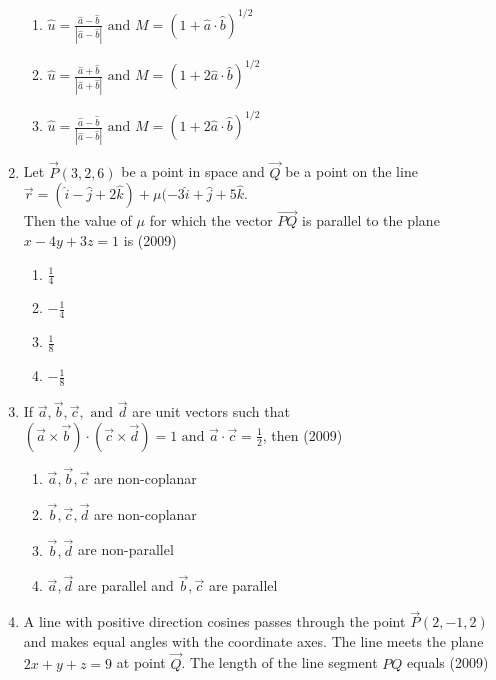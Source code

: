 \documentclass[journal,12pt,onecolumn]{IEEEtran}
\theoremstyle{remark}
\begin{document}
\begin{enumerate}
\begin{enumerate}
    \item $\hat{u} = \frac{\hat{a}-\hat{b}}{|\hat{a}-\hat{b}|} \text{ and } M = (1+\hat{a} \cdot \hat{b})^{1/2}$
    \item $\hat{u} = \frac{\hat{a}+\hat{b}}{|\hat{a}+\hat{b}|} \text{ and } M = (1+2\hat{a} \cdot \hat{b})^{1/2}$
    \item $\hat{u} = \frac{\hat{a}-\hat{b}}{|\hat{a}-\hat{b}|} \text{ and } M = (1+2\hat{a} \cdot \hat{b})^{1/2}$
    \end{enumerate}
    \item Let $\vec{P}(3,2,6)$ be a point in space and $\vec{Q}$ be a point on the line \\ 
    $\vec{r} = (\hat{i} - \hat{j} + 2\hat{k}) + \mu(-3\hat{i} +\hat{j}+5\hat{k}.$
    \\ Then the value of $\mu$ for which the vector $\overrightarrow{PQ}$ is parallel to the plane $x-4y+3z=1$ is
    \hfill{(2009)}
    \begin{multicols}{2}
    \begin{enumerate}
    \item $\frac{1}{4}$
    \item $-\frac{1}{4}$
    \item $\frac{1}{8}$
    \item $-\frac{1}{8}$
    \end{enumerate}
    \end{multicols}
    \item If $\vec{a}, \vec{b}, \vec{c},\text{ and } \vec{d}$ are unit vectors such that $(\vec{a} \times \vec{b}) \cdot (\vec{c} \times \vec{d}) = 1 \text{ and } \vec{a} \cdot \vec{c} = \frac{1}{2}$, then
    \hfill{(2009)}
    \begin{enumerate}
    \item $\vec{a}, \vec{b}, \vec{c}$ are non-coplanar
    \item $\vec{b}, \vec{c}, \vec{d}$ are non-coplanar
    \item $\vec{b}, \vec{d}$ are non-parallel
    \item $\vec{a}, \vec{d}$ are parallel and $\vec{b}, \vec{c}$ are parallel 
    \end{enumerate}
    \item A line with positive direction cosines passes through the point $\vec{P}(2,-1,2)$ and makes equal angles with the coordinate axes. The line meets the plane $2x+y+z=9$ at point $\vec{Q}$. The length of the line segment $PQ$ equals 
    \hfill{(2009)}
    \begin{multicols}{2}

\end{multicols}
\end{enumerate}
\end{document}
